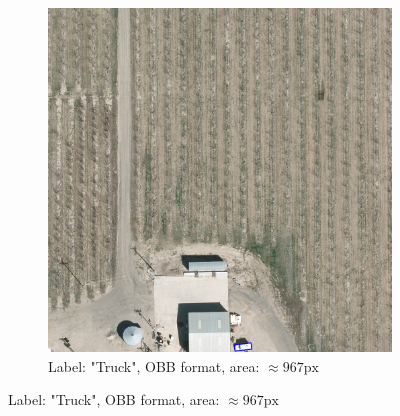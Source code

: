 \begin{figure}[h]
\begin{subfigure}[b]{0.45\textwidth}
        \includegraphics[trim={550pt 0pt 410pt 990pt},clip,width=\textwidth]{images/015Results/01abb_vs_obb/obb_truck.png}
        \caption{Label: "Truck", OBB format, area: $\approx 967 \text{px}$}
        \label{fig:obb_truck}
    \end{subfigure}
    
    \vspace{0.5cm} %
    

\end{figure}
